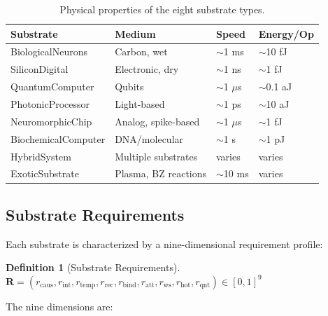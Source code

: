\documentclass[12pt,a4paper]{article}
\newtheorem{definition}{Definition}
\begin{document}
\begin{table}[H]
\centering
\caption{Physical properties of the eight substrate types.}
\label{tab:substrate-properties}
\begin{tabular}{llll}
\toprule
\textbf{Substrate} & \textbf{Medium} & \textbf{Speed} & \textbf{Energy/Op} \\
\midrule
BiologicalNeurons & Carbon, wet & $\sim$1 ms & $\sim$10 fJ \\
SiliconDigital & Electronic, dry & $\sim$1 ns & $\sim$1 fJ \\
QuantumComputer & Qubits & $\sim$1 $\mu$s & $\sim$0.1 aJ \\
PhotonicProcessor & Light-based & $\sim$1 ps & $\sim$10 aJ \\
NeuromorphicChip & Analog, spike-based & $\sim$1 $\mu$s & $\sim$1 fJ \\
BiochemicalComputer & DNA/molecular & $\sim$1 s & $\sim$1 pJ \\
HybridSystem & Multiple substrates & varies & varies \\
ExoticSubstrate & Plasma, BZ reactions & $\sim$10 ms & varies \\
\bottomrule
\end{tabular}
\end{table}

\subsection{Substrate Requirements}

Each substrate is characterized by a nine-dimensional requirement profile:

\begin{definition}[Substrate Requirements]
$\mathbf{R} = (r_{\text{caus}}, r_{\text{int}}, r_{\text{temp}}, r_{\text{rec}}, r_{\text{bind}}, r_{\text{att}}, r_{\text{ws}}, r_{\text{hot}}, r_{\text{qnt}}) \in [0, 1]^9$
\end{definition}

The nine dimensions are:
\end{document}
